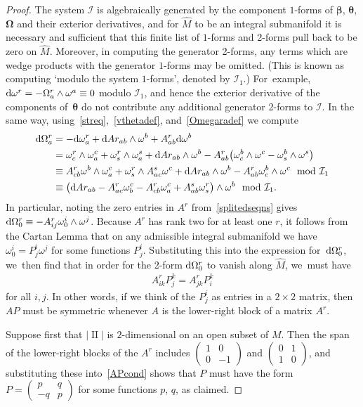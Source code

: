 \documentclass[10pt,a4paper]{amsart}
\def\vOmega{\boldsymbol{\Omega}}
\def\vbeta{\boldsymbol{\beta}}
\def\vtheta{\boldsymbol{\theta}}
\def\vOmega{\boldsymbol{\Omega}}
\def\II{\operatorname{II}} %
\def\I{\mathcal{I}}
\def\calI{\mathcal{I}}
\def\w{\omega}
\def\Mhat{\widehat{M}}
\numberwithin{equation}{section}
\begin{document}
\begin{proof}
The system $\calI$ is algebraically generated by the component $1$-forms of $\vbeta$, $\vtheta$, $\vOmega$ and their exterior derivatives, and for $\Mhat$ to be an integral submanifold it is necessary and sufficient that this finite list of $1$-forms and 2-forms pull back to be zero on $\Mhat$. Moreover, in computing the generator 2-forms, any terms which are wedge products with the generator $1$-forms may be omitted. (This is known as computing `modulo the system $1$-forms', denoted by $\calI_1$.) For~example, ${\rm d}\w^r = -\Omega^r_a \wedge \w^a \equiv 0$ modulo $\calI_1$, and hence the exterior derivative of the components of~$\vtheta$ do not contribute any additional generator 2-forms to $\I$. In the same way, using~\eqref{streq},~\eqref{vthetadef}, and~\eqref{Omegaradef} we compute
\begin{align*}
{\rm d} \Omega^r_a & = - {\rm d} \omega^r_a + {\rm d} Ar_{ab} \wedge \omega^b + A^r_{ab} {\rm d} \omega^b
\\
& = \omega^r_c \wedge \omega^c_a + \omega^r_s \wedge \omega^s_a + {\rm d} Ar_{ab} \wedge \omega^b - A^r_{ab} \big(\omega^b_c \wedge \omega^c - \omega^b_s \wedge \omega^s\big)
\\
& \equiv A^r_{cb} \omega^b \wedge \omega^c_a + \omega^r_s \wedge A^s_{ac} \omega^c + {\rm d} Ar_{ab} \wedge \omega^b - A^r_{ab} \omega^b_c \wedge \omega^c \mod \calI_1
\\
& \equiv \big( {\rm d} Ar_{ab} -A^r_{ac} \w^c_b -A^r_{cb} \w^c_a + A^s_{ab} \w^r_s\big) \wedge \w^b \mod \calI_1.
\end{align*}
In particular, noting the zero entries in $A^r$ from~\eqref{splitedseqns} gives ${\rm d} \Omega^r_0 \equiv -A^r_{ij} \w^i_0 \wedge \w^j$. Because $A^r$ has rank two for at least one $r$, it follows from the Cartan Lemma that on any admissible integral submanifold we have $\w^i_0= P^i_j \w^j$ for some functions $P^i_j$. Substituting this into the expression for~${\rm d} \Omega^r_0$, we~then find that in order for the 2-form ${\rm d} \Omega^r_0$ to vanish along $\Mhat$, we~must have
\begin{gather} \label{APcond}
A^r_{ik} P^k_j = A^r_{jk} P^k_i
\end{gather}
for all $i,j$. In other words, if we think of the $P^i_j$ as entries in a $2\times 2$ matrix, then $AP$ must be symmetric whenever $A$ is the lower-right block of a matrix $A^r$.

Suppose first that $|\II|$ is $2$-dimensional on an open subset of $M$. Then the span of the lower-right blocks of the $A^r$ includes $\left(\begin{smallmatrix} 1 & 0 \\ 0 & -1 \end{smallmatrix}\right)$ and $\left(\begin{smallmatrix} 0 & 1 \\ 1 & 0 \end{smallmatrix}\right)$, and substituting these into~\eqref{APcond} shows that $P$ must have the form $P = \left(\begin{smallmatrix} p & q \\ -q & p \end{smallmatrix}\right)$ for some functions $p$, $q$, as claimed.


\end{proof}
\end{document}
